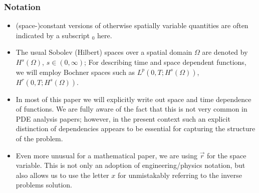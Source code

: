 \documentclass{ws-m3as}
\begin{document}
\subsubsection*{Notation}
\begin{itemize}
\item (space-)constant versions of otherwise spatially variable quantities are often indicated by a subscript ${}_0$ here.
\item The usual Sobolev (Hilbert) spaces over a spatial domain $\Omega$ are denoted by $H^s(\Omega)$, $s\in(0,\infty)$; 
For describing time and space dependent functions, we will employ Bochner spaces such as 
$L^p(0,T;H^s(\Omega))$, 
$H^r(0,T;H^s(\Omega))$.
\item In most of this paper we will explicitly write out space and time dependence of functions. We are fully aware of the fact that this is not very common in PDE analysis papers; however, in the present context such an explicit distinction of dependencies appears to be essential for capturing the structure of the problem.
\item Even more unusual for a mathematical paper, we are using $\vec r$ for the space variable.
This is not only an adoption of engineering/physics notation, but also allows us to use the letter $x$ for unmistakably referring to the inverse problems solution.  
\end{itemize}
\end{document}

